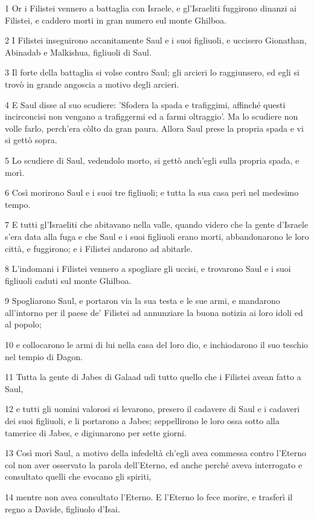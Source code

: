 \par 1 Or i Filistei vennero a battaglia con Israele, e gl'Israeliti fuggirono dinanzi ai Filistei, e caddero morti in gran numero sul monte Ghilboa.
\par 2 I Filistei inseguirono accanitamente Saul e i suoi figliuoli, e uccisero Gionathan, Abinadab e Malkishua, figliuoli di Saul.
\par 3 Il forte della battaglia si volse contro Saul; gli arcieri lo raggiunsero, ed egli si trovò in grande angoscia a motivo degli arcieri.
\par 4 E Saul disse al suo scudiere: 'Sfodera la spada e trafiggimi, affinché questi incirconcisi non vengano a trafiggermi ed a farmi oltraggio'. Ma lo scudiere non volle farlo, perch'era còlto da gran paura. Allora Saul prese la propria spada e vi si gettò sopra.
\par 5 Lo scudiere di Saul, vedendolo morto, si gettò anch'egli sulla propria spada, e morì.
\par 6 Così morirono Saul e i suoi tre figliuoli; e tutta la sua casa perì nel medesimo tempo.
\par 7 E tutti gl'Israeliti che abitavano nella valle, quando videro che la gente d'Israele s'era data alla fuga e che Saul e i suoi figliuoli erano morti, abbandonarono le loro città, e fuggirono; e i Filistei andarono ad abitarle.
\par 8 L'indomani i Filistei vennero a spogliare gli uccisi, e trovarono Saul e i suoi figliuoli caduti sul monte Ghilboa.
\par 9 Spogliarono Saul, e portaron via la sua testa e le sue armi, e mandarono all'intorno per il paese de' Filistei ad annunziare la buona notizia ai loro idoli ed al popolo;
\par 10 e collocarono le armi di lui nella casa del loro dio, e inchiodarono il suo teschio nel tempio di Dagon.
\par 11 Tutta la gente di Jabes di Galaad udì tutto quello che i Filistei avean fatto a Saul,
\par 12 e tutti gli uomini valorosi si levarono, presero il cadavere di Saul e i cadaveri dei suoi figliuoli, e li portarono a Jabes; seppellirono le loro ossa sotto alla tamerice di Jabes, e digiunarono per sette giorni.
\par 13 Così morì Saul, a motivo della infedeltà ch'egli avea commessa contro l'Eterno col non aver osservato la parola dell'Eterno, ed anche perché aveva interrogato e consultato quelli che evocano gli spiriti,
\par 14 mentre non avea consultato l'Eterno. E l'Eterno lo fece morire, e trasferì il regno a Davide, figliuolo d'Isai.

